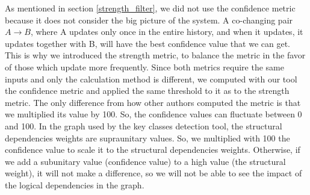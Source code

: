\documentclass[runningheads]{comsis2}
\begin{document}
As mentioned in section \ref{strength_filter}, we did not use the confidence metric because it does not consider the big picture of the system.
A co-changing pair $A \rightarrow B$, where A updates only once in the entire history, and when it updates, it updates together with B, will have the best confidence value that we can get. This is why we introduced the strength metric, to balance the metric in the favor of those which update more frequently.
Since both metrics require the same inputs and only the calculation method is different, we computed with our tool the confidence metric and applied the same threshold to it as to the strength metric. The only difference from how other authors computed the metric is that we multiplied its value by 100. So, the confidence values can fluctuate between 0 and 100.
In the graph used by the key classes detection tool, the structural dependencies weights are supraunitary values. So, we multiplied with 100 the confidence value to scale it to the structural dependencies weights. Otherwise, if we add a subunitary value (confidence value) to a high value (the structural weight), it will not make a difference, so we will not be able to see the impact of the logical dependencies in the graph.

\begin{table}[!h]
\setlength\tabcolsep{3.5pt}
\caption{ Average results obtained with strength versus confidence metric.}
\label{tab:confidence_vs_strength}
\centering
{}
\end{table}
\end{document}
